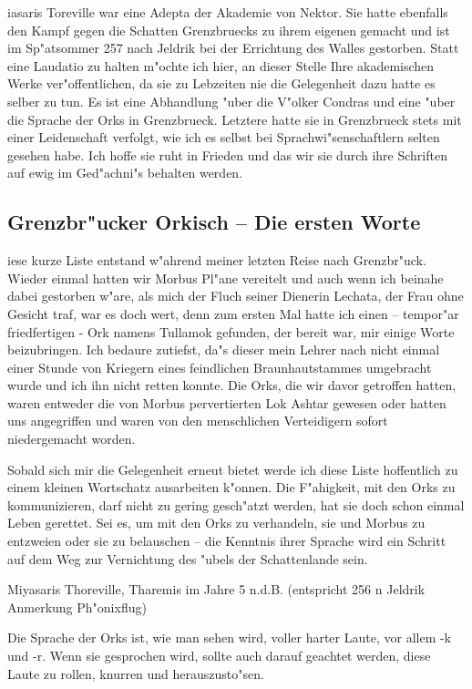 \documentclass[a5paper,8pt]{book}
\begin{document}
iasaris Toreville war eine Adepta der Akademie von Nektor. Sie hatte ebenfalls den Kampf gegen die Schatten Grenzbruecks zu ihrem eigenen gemacht und ist im Sp"atsommer 257 nach Jeldrik bei der Errichtung des Walles gestorben.
Statt eine Laudatio zu halten m"ochte ich hier, an dieser Stelle Ihre akademischen Werke ver"offentlichen, da sie zu Lebzeiten nie die Gelegenheit dazu hatte es selber zu tun. Es ist eine Abhandlung "uber die V"olker Condras und eine "uber die Sprache der Orks in Grenzbrueck. Letztere hatte sie in Grenzbrueck stets mit einer Leidenschaft verfolgt, wie ich es selbst bei Sprachwi"senschaftlern selten gesehen habe. Ich hoffe sie ruht in Frieden und das wir sie durch ihre Schriften auf ewig im Ged"achni"s behalten werden.

\newpage

\subsection{ Grenzbr"ucker Orkisch – Die ersten Worte}

iese kurze Liste entstand w"ahrend meiner letzten Reise nach Grenzbr"uck. Wieder einmal hatten wir Morbus Pl"ane vereitelt und auch wenn ich beinahe dabei gestorben w"are, als mich der Fluch seiner Dienerin Lechata, der Frau ohne Gesicht traf, war es doch wert, denn zum ersten Mal hatte ich einen – tempor"ar friedfertigen - Ork namens Tullamok gefunden, der bereit war, mir einige Worte beizubringen. Ich bedaure zutiefst, da"s dieser mein Lehrer nach nicht einmal einer Stunde von Kriegern eines feindlichen Braunhautstammes umgebracht wurde und ich ihn nicht retten konnte. Die Orks, die wir davor getroffen hatten, waren entweder die von Morbus pervertierten Lok Ashtar gewesen oder hatten uns angegriffen und waren von den menschlichen Verteidigern sofort niedergemacht worden. 

Sobald sich mir die Gelegenheit erneut bietet werde ich diese Liste hoffentlich zu einem kleinen Wortschatz ausarbeiten k"onnen. Die F"ahigkeit, mit den Orks zu kommunizieren, darf nicht zu gering gesch"atzt werden, hat sie doch schon einmal Leben gerettet. Sei es, um mit den Orks zu verhandeln, sie und Morbus zu entzweien oder sie zu belauschen – die Kenntnis  ihrer Sprache wird ein Schritt auf dem Weg zur Vernichtung des "ubels der Schattenlande sein.

Miyasaris Thoreville, Tharemis im Jahre 5 n.d.B. (entspricht 256 n Jeldrik Anmerkung Ph"onixflug)

Die Sprache der Orks ist, wie man sehen wird, voller harter Laute, vor allem -k und -r. Wenn sie gesprochen wird, sollte auch darauf geachtet werden, diese Laute zu rollen, knurren und herauszusto"sen. 
\end{document}
